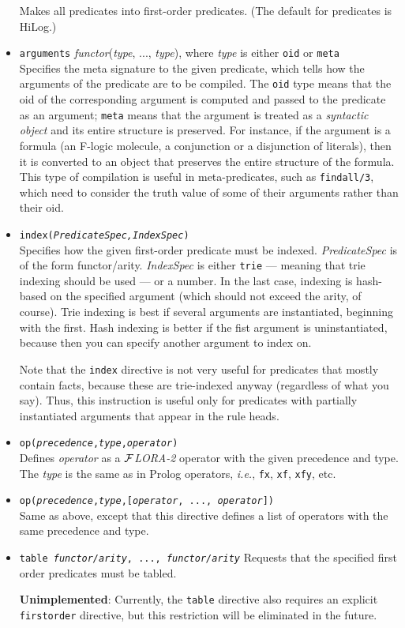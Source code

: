 \documentclass[11pt]{article}
\newcommand{\FLORA}{{\mbox{${\cal F}${\small\it LORA}\rm\emph{-2}}}\xspace}
\newcommand{\fl}{\mbox{F-logic}\xspace}
\begin{document}
\begin{itemize}
  Makes all predicates into first-order predicates. (The default for predicates
  is HiLog.)
\item {\tt arguments} \emph{functor}(\emph{type}, ..., \emph{type}), where
  \emph{type} is either {\tt oid} or {\tt meta}
  \\
  Specifies the meta signature to the given predicate, which tells how the
  arguments of the predicate are to be compiled. The {\tt oid} type means
  that the oid of the corresponding argument is computed and passed to the
  predicate as an argument; {\tt meta} means that the argument is treated
  as a \emph{syntactic object} and its entire structure is preserved. For
  instance, if the argument is a formula (an \fl molecule, a conjunction or
  a disjunction of literals), then it is converted to an object that
  preserves the entire structure of the formula.  This type of compilation
  is useful in meta-predicates, such as {\tt findall/3}, which need to
  consider the truth value of some of their arguments rather than their
  oid.
\item {\tt index({\it PredicateSpec,IndexSpec})}
  \\
  Specifies how the given first-order predicate must be indexed.
  {\em PredicateSpec} is of the form functor/arity. \emph{IndexSpec} is
  either {\tt trie} --- meaning that trie indexing should be used --- or a
  number. In the last case, indexing is hash-based on the specified
  argument (which should not exceed the arity, of course).
  Trie indexing is best if several arguments are instantiated, beginning
  with the first. Hash indexing is better if the fist argument is
  uninstantiated, because then you can specify another argument to index
  on.
  
  Note that the {\tt index} directive is not very useful for predicates
  that mostly contain facts, because these are trie-indexed anyway
  (regardless of what you say). Thus, this instruction is useful only for
  predicates with partially instantiated arguments that appear in the rule
  heads.
\item {\tt op({\it precedence},{\it type},{\it operator})}
  \\
  Defines \emph{operator} as a \FLORA operator with the given precedence
  and type. The \emph{type} is the same as in Prolog operators, {\it i.e.},
  {\tt fx}, {\tt xf}, {\tt xfy}, etc.
\item {\tt op({\it precedence},{\it type},[{\it operator}, ..., {\it operator}])}
  \\
  Same as above, except that this directive defines a list of operators
  with the same precedence and type.
\item {\tt table {\it functor/arity}, ..., {\it functor/arity}}
  Requests that the specified first order predicates must be tabled.
  
  {\bf Unimplemented}: Currently, the {\tt table} directive also requires
  an explicit {\tt firstorder} directive, but this restriction will be
  eliminated in the future.
\end{itemize}
\end{document}
